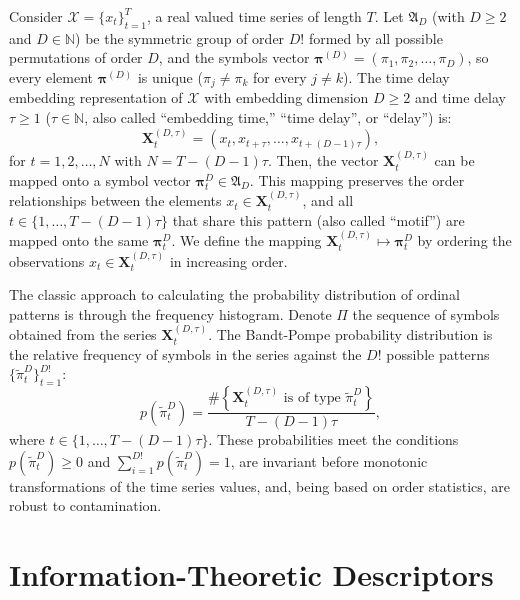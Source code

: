 \documentclass[a4,11pt]{pssbmac}
\begin{document}
	Consider ${\mathcal X} = \{x_t\}_{t=1}^{T}$, a real valued time series of length $T$. 
	Let ${\mathfrak A}_{D}$ (with $D \geq 2$ and $D \in {\mathbb  N}$) be the symmetric group of order $D!$ formed by all 
	possible permutations of order $D$, and the symbols  vector 
	${\bm \pi}^{(D)} = (\pi_1, \pi_2, \dots, \pi_D)$, so every element ${\bm \pi}^{(D)}$ is unique 
	($\pi_j \neq \pi_k$ for every $j \neq k$). 
	The time delay embedding representation of ${\mathcal X}$
	with embedding dimension $D \geq 2$ and time delay $\tau \geq 1$ ($\tau \in {\mathbb  N}$, also called ``embedding time,'' ``time delay'', or ``delay'') is:
	\begin{equation} 
		{\mathbf X}^{(D,\tau)}_t =( x_t,x_{t+\tau},\dots,x_{t+(D-1)\tau} ) ,
		\label{eq:time-delay}
	\end{equation} 
	for $t = 1,2,\dots,N$ with $N = T-(D-1) \tau$.
	Then, the vector ${\mathbf X}^{(D,\tau)}_t$ can be mapped onto a symbol vector ${\bm \pi}_t^D \in {\mathfrak A}_{D}$. 
	This mapping preserves the order relationships between the elements 
	$x_t  \in {\mathbf X}^{(D,\tau)}_t$, and all $t \in \{1,\dots,T-(D-1)\tau\}$ that share this pattern (also called ``motif'') are mapped onto the same 
	${\bm \pi}_t^{D}$.
	We define the mapping ${\mathbf X}_t^{(D,\tau)} \mapsto {\mathbf \pi}_t^{D}$ by ordering the observations $x_t \in {\mathbf X}_t^{(D,\tau)}$ in increasing order.
	
	The classic approach to calculating the probability distribution of ordinal patterns is through the frequency histogram.
	Denote $\Pi$ the sequence of symbols obtained from the series $\mathbf{X}_t^{(D,\tau)}$.
	The Bandt-Pompe probability distribution is the relative frequency of symbols in the series against the $D!$ possible patterns $\{\widetilde\pi_t^D \}_{t = 1}^{D!}$:
	\begin{equation}
		p(\widetilde\pi_t^D) = \frac{\#\left \{\mathbf{X}_t^{(D,\tau)} \text{ is of type } \widetilde\pi_t^D\right \}}{T- (D-1)\tau},  
	\end{equation}
	where  $t\in \{1, \dots, T-(D-1)\tau\}$.
	These probabilities meet the conditions $p(\widetilde\pi_t^D) \ge 0$ and  $\sum_{i=1}^{D!} p(\widetilde\pi_t^D) = 1$, are invariant before monotonic transformations of the time series values, and, being based on order statistics, are robust to contamination.
	
	\section{Information-Theoretic Descriptors}\label{HC}
	
\end{document}
